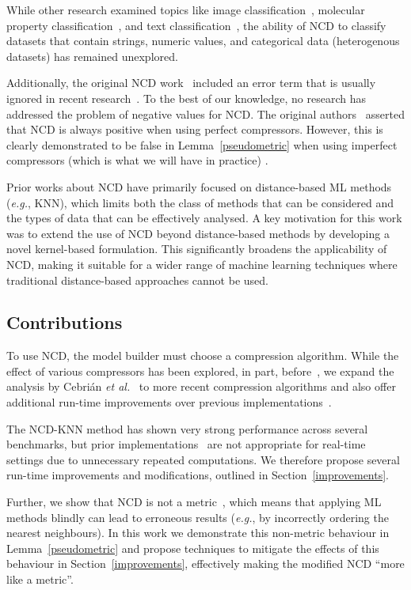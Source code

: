 \documentclass[preprint,12pt]{article}
\begin{document}
While other research examined topics like image classification~\cite{opitz2023gzip}, molecular property classification~\cite{weinreich2023parameter}, and text classification~\cite{nishida2011tweet}, the ability of NCD to classify datasets that contain strings, numeric values, and categorical data (heterogenous datasets) has remained unexplored.

Additionally, the original NCD work~\cite{ncd} included an error term that is usually ignored in recent research~\cite{opitz2023gzip,weinreich2023parameter,nishida2011tweet,jiang2022less}.
To the best of our knowledge, no research has addressed the problem of negative values for NCD. 
The original authors~\cite{ncd} asserted that NCD is always positive when using perfect compressors.
However, this is clearly demonstrated to be false in Lemma~\ref{pseudometric} when using imperfect compressors (which is what we will have in practice) .

Prior works about NCD have primarily focused on distance-based ML methods (\textit{e.g.}, KNN), which limits both the class of methods that can be considered and the types of data that can be effectively analysed.
A key motivation for this work was to extend the use of NCD beyond distance-based methods by developing a novel kernel-based formulation. This significantly broadens the applicability of NCD, making it suitable for a wider range of machine learning techniques where traditional distance-based approaches cannot be used.



\subsection{Contributions}

To use NCD, the model builder must choose a compression algorithm.
While the effect of various compressors has been explored, in part, before~\cite{ncd_pitfalls}, we expand the analysis by Cebri\'{a}n \textit{et al.}~\cite{ncd_pitfalls} to more recent compression algorithms and also offer additional run-time improvements over previous implementations~\cite{jiang2022less}.

The NCD-KNN method has shown very strong performance across several benchmarks, but prior implementations~\cite{jiang2022less} are not appropriate for real-time settings due to unnecessary repeated computations.
We therefore propose several run-time improvements and modifications, outlined in Section~\ref{improvements}.

Further, we show that NCD is not a metric~\cite{opitz2023gzip, weinreich2023parameter, nishida2011tweet, jiang2022less}, which means that applying ML methods blindly can lead to erroneous results (\textit{e.g.}, by incorrectly ordering the nearest neighbours).
In this work we demonstrate this non-metric behaviour in Lemma~\ref{pseudometric} and propose techniques to mitigate the effects of this behaviour in Section~\ref{improvements}, effectively making the modified NCD ``more like a metric''.
\end{document}
